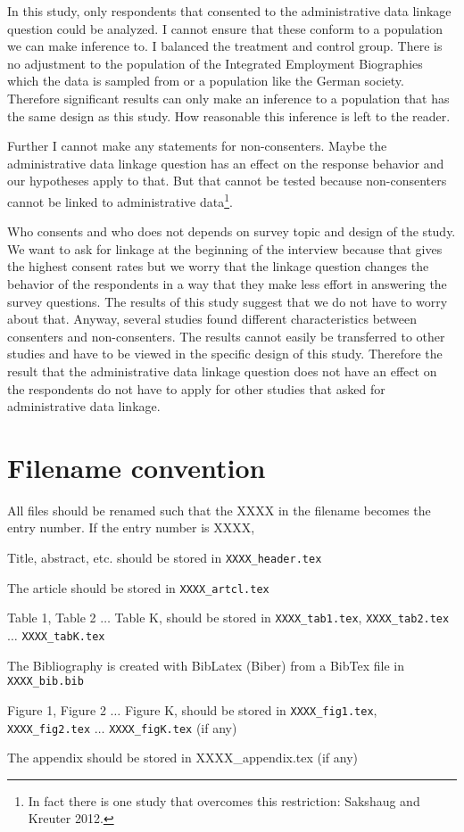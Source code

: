 In this study, only respondents that consented to the administrative data linkage question could be analyzed. I cannot ensure that these conform to a population we can make inference to. I balanced the treatment and control group. There is no adjustment to the population of the Integrated Employment Biographies which the data is sampled from or a population like the German society. Therefore significant results can only make an inference to a population that has the same design as this study. How reasonable this inference is left to the reader. 

Further I cannot make any statements for non-consenters. Maybe the administrative data linkage question has an effect on the response behavior and our hypotheses apply to that. But that cannot be tested because non-consenters cannot be linked to administrative data\footnote{In fact there is one study that overcomes this restriction: Sakshaug and Kreuter 2012.}.

Who consents and who does not depends on survey topic and design of the study. 
We want to ask for linkage at the beginning of the interview because that gives the highest consent rates but we worry that the linkage question changes the behavior of the respondents in a way that they make less effort in answering the survey questions. The results of this study suggest that we do not have to worry about that. Anyway, several studies found different characteristics between consenters and non-consenters. The results cannot easily be transferred to other studies and have to be viewed in the specific design of this study. Therefore the result that the administrative data linkage question does not have an effect on the respondents do not have to apply for other studies that asked for administrative data linkage. 



\section{Filename convention}

All files should be renamed such that the XXXX in the filename becomes
the entry number. If the entry number is XXXX,

\bci
\item Title, abstract, etc. should be stored in  \texttt{XXXX\_header.tex}
\item The article should be stored in \texttt{XXXX\_artcl.tex}
\item Table 1, Table 2 $\ldots$ Table K, should be stored in
  \texttt{XXXX\_tab1.tex}, \texttt{XXXX\_tab2.tex} $\ldots$
  \texttt{XXXX\_tabK.tex} 
\item The Bibliography is created with BibLatex (Biber) from a BibTex
  file in \texttt{XXXX\_bib.bib}
\item Figure 1, Figure 2 $\ldots$ Figure K, should be stored in
  \texttt{XXXX\_fig1.tex}, \texttt{XXXX\_fig2.tex} $\ldots$
  \texttt{XXXX\_figK.tex} (if any)
\item The appendix should be stored in \textrm{XXXX\_appendix.tex} (if
  any) \eci

